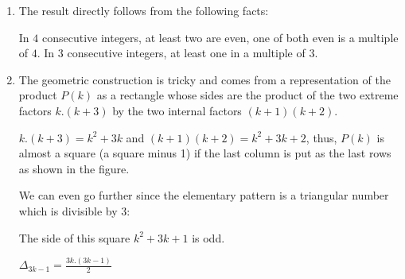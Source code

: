 \documentclass{article}[12pt]
\begin{document}
\begin{enumerate}
\item The result directly follows from the following facts:

In $4$ consecutive integers, at least two are even, one of both even is a multiple of $4$.
In $3$ consecutive integers, at least one in a multiple of $3$.
\item
The geometric construction is tricky and comes from a representation of the product $P(k)$ as a rectangle whose sides are the product of the two extreme factors 
$k.(k+3)$ by the two internal factors $(k+1)(k+2)$.

$k.(k+3) = k^2 + 3k$ and $(k+1)(k+2) = k^2 + 3k +2$, thus, $P(k)$ is almost a square (a square minus 1)
if the last column is put as the last rows as shown in the figure.

We can even go further since the elementary pattern is a triangular number which is divisible by $3$:

The side of this square
$k^2+3k+1$ is odd. 

$\Delta_{3k-1} = \frac{3k.(3k-1)}{2}$
\end{enumerate}
\end{document}
